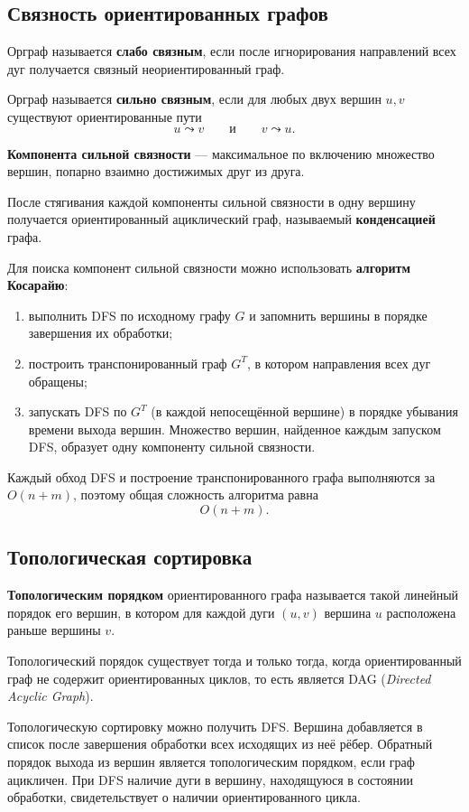 \subsection{Связность ориентированных графов}

Орграф называется \textbf{слабо связным}, если после игнорирования направлений всех дуг получается связный неориентированный граф.

Орграф называется \textbf{сильно связным}, если для любых двух вершин $u,v$ существуют ориентированные пути
\[
u\leadsto v
\qquad\text{и}\qquad
v\leadsto u.
\]

\textbf{Компонента сильной связности} --- максимальное по включению множество вершин, попарно взаимно достижимых друг из друга.

После стягивания каждой компоненты сильной связности в одну вершину получается ориентированный ациклический граф, называемый \textbf{конденсацией} графа.

Для поиска компонент сильной связности можно использовать \textbf{алгоритм Косарайю}:
\begin{enumerate}
	\item выполнить DFS по исходному графу $G$ и запомнить вершины в порядке завершения их обработки;
	\item построить транспонированный граф $G^T$, в котором направления всех дуг обращены;
	\item запускать DFS по $G^T$ (в каждой непосещённой вершине) в порядке убывания времени выхода вершин. Множество вершин, найденное каждым запуском DFS, образует одну компоненту сильной связности.
\end{enumerate}

Каждый обход DFS и построение транспонированного графа выполняются за $O(n+m)$, поэтому общая сложность алгоритма равна 
\[
O(n+m).
\]

\subsection{Топологическая сортировка}

\textbf{Топологическим порядком} ориентированного графа называется такой линейный порядок его вершин, в котором для каждой дуги $(u,v)$ вершина $u$ расположена раньше вершины $v$.

Топологический порядок существует тогда и только тогда, когда ориентированный граф не содержит ориентированных циклов, то есть является DAG (\textit{Directed Acyclic Graph}).

Топологическую сортировку можно получить DFS. Вершина добавляется в список после завершения обработки всех исходящих из неё рёбер. Обратный порядок выхода из вершин является топологическим порядком, если граф ацикличен. При DFS наличие дуги в вершину, находящуюся в состоянии обработки, свидетельствует о наличии ориентированного цикла.

